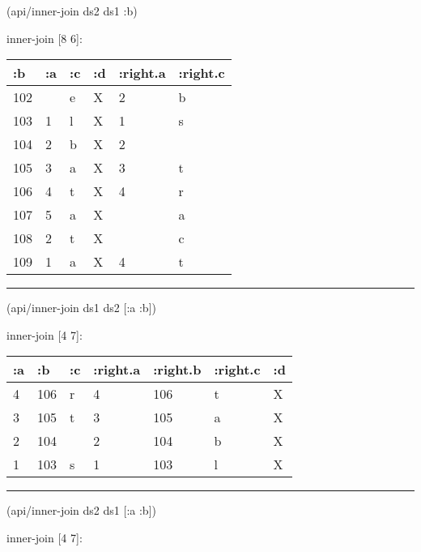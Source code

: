 \documentclass[]{article}
\newenvironment{Shaded}{\begin{snugshade}}{\end{snugshade}}
\newcommand{\AttributeTok}[1]{\textcolor[rgb]{0.77,0.63,0.00}{#1}}
\newcommand{\NormalTok}[1]{#1}
\begin{document}
\begin{Shaded}
\begin{Highlighting}[]
\NormalTok{(api/inner-join ds2 ds1 }\AttributeTok{:b}\NormalTok{)}
\end{Highlighting}
\end{Shaded}

inner-join {[}8 6{]}:

\begin{longtable}[]{@{}llllll@{}}
\toprule
:b & :a & :c & :d & :right.a & :right.c\tabularnewline
\midrule
\endhead
102 & & e & X & 2 & b\tabularnewline
103 & 1 & l & X & 1 & s\tabularnewline
104 & 2 & b & X & 2 &\tabularnewline
105 & 3 & a & X & 3 & t\tabularnewline
106 & 4 & t & X & 4 & r\tabularnewline
107 & 5 & a & X & & a\tabularnewline
108 & 2 & t & X & & c\tabularnewline
109 & 1 & a & X & 4 & t\tabularnewline
\bottomrule
\end{longtable}

\begin{center}\rule{0.5\linewidth}{0.5pt}\end{center}

\begin{Shaded}
\begin{Highlighting}[]
\NormalTok{(api/inner-join ds1 ds2 [}\AttributeTok{:a} \AttributeTok{:b}\NormalTok{])}
\end{Highlighting}
\end{Shaded}

inner-join {[}4 7{]}:

\begin{longtable}[]{@{}lllllll@{}}
\toprule
:a & :b & :c & :right.a & :right.b & :right.c & :d\tabularnewline
\midrule
\endhead
4 & 106 & r & 4 & 106 & t & X\tabularnewline
3 & 105 & t & 3 & 105 & a & X\tabularnewline
2 & 104 & & 2 & 104 & b & X\tabularnewline
1 & 103 & s & 1 & 103 & l & X\tabularnewline
\bottomrule
\end{longtable}

\begin{center}\rule{0.5\linewidth}{0.5pt}\end{center}

\begin{Shaded}
\begin{Highlighting}[]
\NormalTok{(api/inner-join ds2 ds1 [}\AttributeTok{:a} \AttributeTok{:b}\NormalTok{])}
\end{Highlighting}
\end{Shaded}

inner-join {[}4 7{]}:
\end{document}
